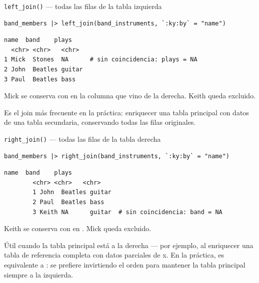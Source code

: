\documentclass[8pt]{beamer}
\begin{document}
	\begin{frame}[fragile]{\texttt{left\_join()} — todas las filas de la tabla izquierda}
		\begin{lstlisting}[style=RScript]
band_members |> left_join(band_instruments, `:ky:by` = "name")
\end{lstlisting}
		\begin{lstlisting}[style=RConsole]
  name  band    plays
  <chr> <chr>   <chr>
1 Mick  Stones  NA      # sin coincidencia: plays = NA
2 John  Beatles guitar
3 Paul  Beatles bass
\end{lstlisting}

		Mick se conserva con  en la columna que vino de la derecha. Keith queda excluido.

		\begin{exampleblock}{}
			Es el join más frecuente en la práctica: enriquecer una tabla principal con datos de una tabla secundaria, conservando todas las filas originales.
		\end{exampleblock}
	\end{frame}






	\begin{frame}[fragile]{\texttt{right\_join()} — todas las filas de la tabla derecha}
	\begin{lstlisting}[style=RScript]
		band_members |> right_join(band_instruments, `:ky:by` = "name")
\end{lstlisting}
	\begin{lstlisting}[style=RConsole]
		name  band    plays
		<chr> <chr>   <chr>
		1 John  Beatles guitar
		2 Paul  Beatles bass
		3 Keith NA      guitar  # sin coincidencia: band = NA
\end{lstlisting}
	
	Keith se conserva con  en . Mick queda excluido.

	\begin{exampleblock}{}
		Útil cuando la tabla principal está a la derecha --- por ejemplo, al enriquecer una tabla de referencia completa con datos parciales de x. En la práctica,  es equivalente a : se prefiere  invirtiendo el orden para mantener la tabla principal siempre a la izquierda.
	\end{exampleblock}
\end{frame}
\end{document}
